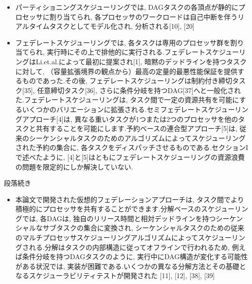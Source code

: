 {    \begin{frame}{}
        \begin{itemize}
            \item パーティショニングスケジューリングでは, DAGタスクの各頂点が静的にプロセッサに割り当てられ, 各プロセッサのワークロードは自己中断を伴うリアルタイムタスクとしてモデル化され, 分析される[10], [20]
            \item フェデレートスケジューリングでは, 各タスクは専用のプロセッサ群を割り当てられ, 実行時にその上で排他的に実行される.フェデレートスケジューリングはLi.et.al.によって最初に提案され[1], 暗黙のデッドラインを持つタスクに対して, （容量拡張境界の観点から）最高の定量的最悪性能保証を提供するものであった.その後, フェデレートスケジューリングは制約付き締切タスク[35], 任意締切タスク[36], さらに条件分岐を持つDAG[37]へと一般化された.フェデレートスケジューリングは, タスク間で一定の資源共有を可能にするいくつかのバリエーションに拡張される.セミフェデレートスケジューリングアプローチ[4]は, 異なる重いタスクが1つまたは2つのプロセッサを他のタスクと共有することを可能にします.予約ベースの連合型アプローチ[5]は, 従来のシーケンシャルタスクのためのアルゴリズムによってスケジューリングされた予約の集合に, 各タスクをディスパッチさせるものである.セクションIで述べたように, [4]と[5]はともにフェデレートスケジューリングの資源浪費の問題を限定的にしか解決していない.
        \end{itemize}
    \end{frame}

    \begin{frame}{段落続き}
        \begin{itemize}
            \item 本論文で開発された仮想的フェデレーションアプローチは, タスク間でより積極的にプロセッサを共有することができます.分解ベースのスケジューリングでは, 各DAGは, 独自のリリース時間と相対デッドラインを持つシーケンシャルなサブタスクの集合に変換され, シーケンシャルタスクのための従来のマルチプロセッサスケジューリングアルゴリズムによってスケジューリングされる.分解はタスクの内部構造に従ってオフラインで行われるため, 例えば条件分岐を持つDAGタスクのように, 実行中にDAG構造が変化する可能性がある状況では, 実装が困難である.いくつかの異なる分解方法とその基礎となるスケジューラビリティテストが開発された [11], [12], [38], [39]
        \end{itemize}
    \end{frame}
}
